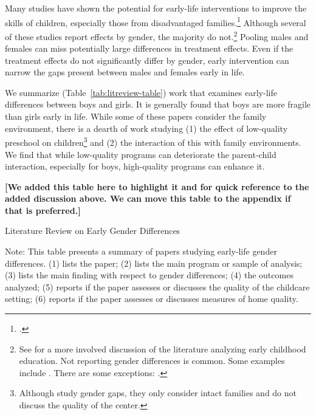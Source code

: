 Many studies have shown the potential for early-life interventions to improve the skills of children, especially those from disadvantaged families.\footnote{\citet{Currie_2011_AER,Elango_Hojman_etal_2016_Early-Edu}.} Although several of these studies report effects by gender, the majority do not.\footnote{See \citet{Elango_Hojman_etal_2016_Early-Edu} for a more involved discussion of the literature analyzing early childhood education. Not reporting gender differences is common. Some examples include \citet{Bernal_Keane_2011_JoLE,Cascio_Schanzenbach_2013_ImpactsExpandingAccess,Bitler_et_al_2014_Head_Start_Unpublished,Kline_Walters_2016_QJE}. There are some exceptions: \citet{Heckman_Moon_etal_2010_QE,Campbell_Conti_etal_2014_EarlyChildhoodInvestments,Garcia_Heckman_Leaf_etal_2017_Comp_CBA_Unpublished}.} Pooling males and females can miss potentially large differences in treatment effects. Even if the treatment effects do not significantly differ by gender, early intervention can narrow the gaps present between males and females early in life. 

We summarize (Table~\ref{tab:litreview-table}) work that examines early-life differences between boys and girls. It is generally found that boys are more fragile than girls early in life. While some of these papers consider the family environment, there is a dearth of work studying (1) the effect of low-quality preschool on children\footnote{Although \citet{Kottelenberg-Lehrer_2014_Gender-Effects} study gender gaps, they only consider intact families and do not discuss the quality of the center.} and (2) the interaction of this with family environments. We find that while low-quality programs can deteriorate the parent-child interaction, especially for boys, high-quality programs can enhance it.

\textbf{[We added this table here to highlight it and for quick reference to the added discussion above. We can move this table to the appendix if that is preferred.]}

\begin{table}
\centering
\caption{Literature Review on Early Gender Differences}
\label{tab:litreview-table}
\begin{adjustbox}{width=1.05\textwidth}
\begin{threeparttable}

\begin{tablenotes}
\Large
\item Note: This table presents a summary of papers studying early-life gender differences. (1) lists the paper; (2) lists the main program or sample of analysis; (3) lists the main finding with respect to gender differences; (4) the outcomes analyzed; (5) reports if the paper assesses or discusses the quality of the childcare setting; (6) reports if the paper assesses or discusses measures of home quality.
\end{tablenotes}
\end{threeparttable}
\end{adjustbox}
\end{table}

